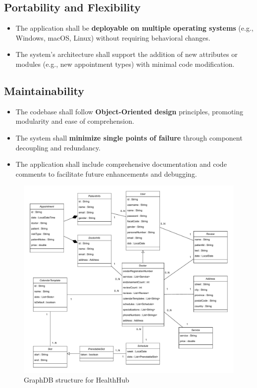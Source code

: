 \subsection{Portability and Flexibility}
\begin{itemize}
	\item The application shall be \textbf{deployable on multiple operating systems} (e.g., Windows, macOS, Linux) without requiring behavioral changes.
	\item The system’s architecture shall support the addition of new attributes or modules (e.g., new appointment types) with minimal code modification.
\end{itemize}

\subsection{Maintainability}
\begin{itemize}
	\item The codebase shall follow \textbf{Object-Oriented design} principles, promoting modularity and ease of comprehension.
	\item The system shall \textbf{minimize single points of failure} through component decoupling and redundancy.
	\item The application shall include comprehensive documentation and code comments to facilitate future enhancements and debugging.
\end{itemize}

\begin{figure}[!h]
    \centering
	\includegraphics[scale=0.69]{./resources/healthhub_UML.pdf}
    \caption{GraphDB structure for HealthHub}
    \label{fig:uml-diagram}
\end{figure}

